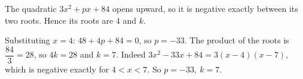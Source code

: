 The quadratic $3x^2+px+84$ opens upward, so it is negative exactly between its two roots. Hence its roots are $4$ and $k$.

Substituting $x=4$: $48+4p+84=0$, so $p=-33$. The product of the roots is $\dfrac{84}{3}=28$, so $4k=28$ and $k=7$. Indeed $3x^2-33x+84=3(x-4)(x-7)$, which is negative exactly for $4<x<7$. So $\boxed{p=-33,\ k=7}$.
